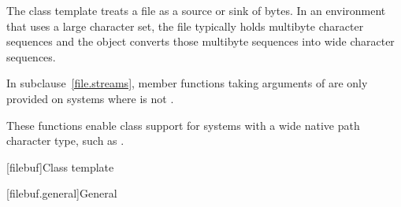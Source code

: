\pnum
\begin{note}
The class template  treats a file as a source or
sink of bytes. In an environment that uses a large character set, the file
typically holds multibyte character sequences and the 
object converts those multibyte sequences into wide character sequences.
\end{note}

\pnum
In subclause~\ref{file.streams}, member functions taking arguments of 
are only provided on systems where  is not .
\begin{note}
These functions enable class  support for systems with a wide native path character type, such as .
\end{note}

[filebuf]{Class template }

[filebuf.general]{General}

